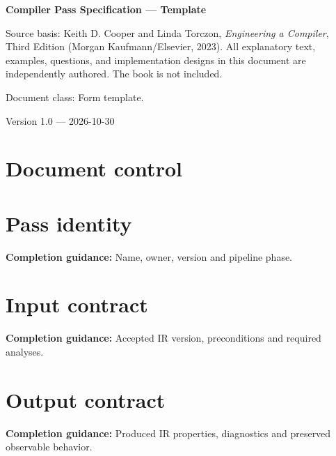 \documentclass[10pt,letterpaper]{article}
\begin{document}
\hypersetup{pageanchor=false}%
\begin{titlepage}
\centering\vspace*{1.0in}
{\Huge\bfseries\textcolor{CompilerBlue}{Compiler Pass Specification --- Template}\par}
\vspace{.22in}{\Large Authoring form and printable record\par}
\vspace{.4in}{\large Compiler Engineering Documentation Suite\par}
\vfill
\begin{minipage}{.86\linewidth}\small
Source basis: Keith D. Cooper and Linda Torczon, \emph{Engineering a Compiler}, Third Edition (Morgan Kaufmann/Elsevier, 2023). All explanatory text, examples, questions, and implementation designs in this document are independently authored. The book is not included.\par\medskip
Document class: Form template.
\end{minipage}
\vfill\textcolor{CompilerGray}{Version 1.0 --- 2026-10-30}\par
\end{titlepage}\hypersetup{pageanchor=true}
\tableofcontents\clearpage
\section{Document control}
\section{Pass identity}
\textbf{Completion guidance:} Name, owner, version and pipeline phase.\par\medskip{}
\section{Input contract}
\textbf{Completion guidance:} Accepted IR version, preconditions and required analyses.\par\medskip{}
\section{Output contract}
\textbf{Completion guidance:} Produced IR properties, diagnostics and preserved observable behavior.\par\medskip{}
\end{document}
